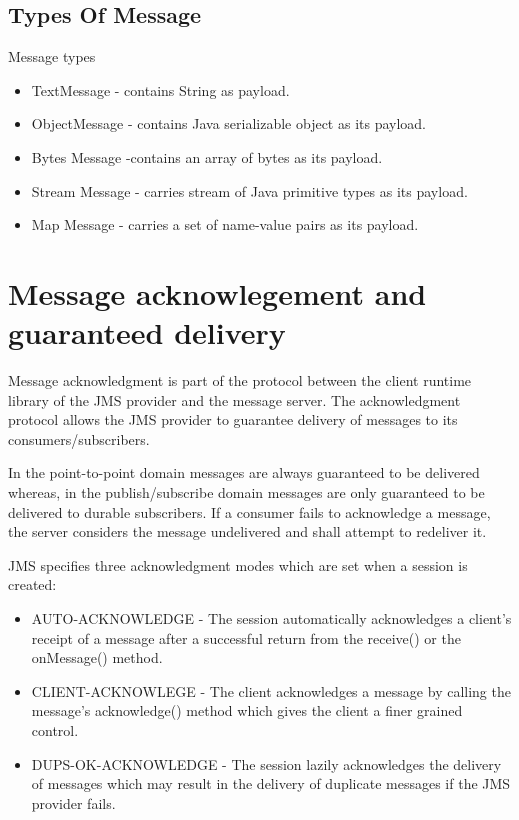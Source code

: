 \documentclass[9pt,twocolumn,twoside]{styles/osajnl}
\begin{document}
\subsection{Types Of Message}

Message types
\begin{itemize}
\item TextMessage - contains String as payload.
\item ObjectMessage - contains Java serializable object as its payload.
\item Bytes Message -contains an array of bytes as its payload.
\item Stream Message - carries stream of Java primitive types as its payload.
\item Map Message - carries a set of name-value pairs as its payload.
\end{itemize}

\section{Message acknowlegement and guaranteed delivery}


Message acknowledgment is part of the protocol between the client
runtime library of the JMS provider and the message server. \cite{www-jms-fischli-article} The
acknowledgment protocol allows the JMS provider to guarantee delivery
of messages to its consumers/subscribers.

In the point-to-point domain messages are always guaranteed to be
delivered whereas, in the publish/subscribe domain messages are only
guaranteed to be delivered to durable subscribers.  If a consumer
fails to acknowledge a message, the server considers the message
undelivered and shall attempt to redeliver it.

JMS specifies three acknowledgment modes which are set when a session
is created:
\begin{itemize}
\item AUTO-ACKNOWLEDGE - The session automatically acknowledges
a client's receipt of a message after a successful return from the
receive() or the onMessage() method.
\item CLIENT-ACKNOWLEGE - The client
acknowledges a message by calling the message's acknowledge() method
which gives the client a finer grained control.
\item DUPS-OK-ACKNOWLEDGE -
The session lazily acknowledges the delivery of messages which may
result in the delivery of duplicate messages if the JMS provider fails.
\cite{www-jms-fischli-article}
\end{itemize}
\end{document}
